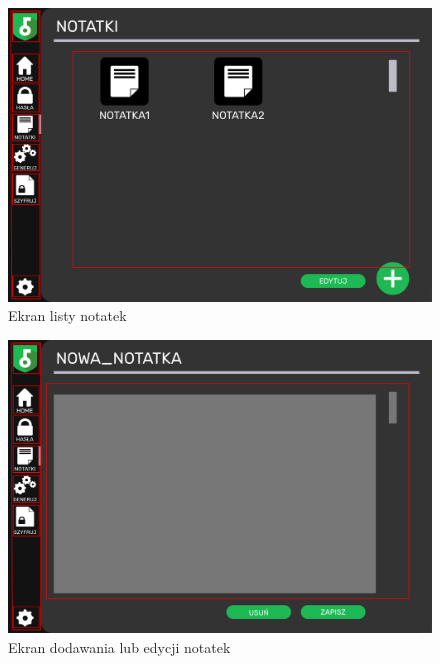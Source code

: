 \documentclass[a4paper]{article}
\begin{document}
\begin{figure}[H]
    \centering
    \includegraphics[width=1\textwidth]{img/ekran_notatek.png}
    \caption{Ekran listy notatek}
    \label{fig:notatki}
\end{figure}

\begin{figure}[H]
    \centering
    \includegraphics[width=1\textwidth]{img/ekran_nowej_not.png}
    \caption{Ekran dodawania lub edycji notatek}
    \label{fig:notatkNowe}
\end{figure}
\end{document}
